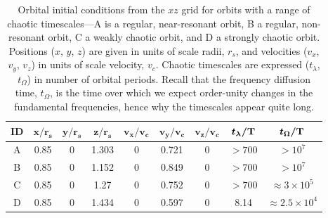 \documentclass[letterpaper,12pt,preprint]{aastex}
\newcommand{\bs}[1]{\boldsymbol{#1}}
\newcommand{\periods}{\ensuremath{{\rm T}}}
\begin{document}
\begin{table}[ht]
\begin{center}
	\begin{tabular}{c | c c c c c c | c c}
		{\bf ID} & $\bs{x/r_s}$ & $\bs{y/r_s}$ & $\bs{z/r_s}$ & $\bs{v_x/v_c}$ & $\bs{v_y/v_c}$ & $\bs{v_z/v_c}$ & $\bs{t_\lambda/\periods}$ & $\bs{t_\Omega/\periods}$ \\\toprule
A & 0.85 & 0 & 1.303 & 0 & 0.721 & 0 & $>700$ & $>10^7$ \\
\midrule
B & 0.85 & 0 & 1.152 & 0 & 0.849 & 0 & $>700$ & $>10^7$\\
\midrule
C & 0.85 & 0 & 1.27 & 0 & 0.752 & 0 & $>700$ & $\approx 3\times10^5$\\
\midrule
D & 0.85 & 0 & 1.434 & 0 & 0.597 & 0 & 8.14 & $\approx 2.5\times10^4$\\
		\bottomrule
		\end{tabular}
	\caption{Orbital initial conditions from the $xz$ grid for orbits with a range of chaotic timescales---A is a regular, near-resonant orbit, B a regular, non-resonant orbit, C a weakly chaotic orbit, and D a strongly chaotic orbit. Positions ($x$, $y$, $z$) are given in units of scale radii, $r_s$, and velocities ($v_x$, $v_y$, $v_z$) in units of scale velocity, $v_c$. Chaotic timescales are expressed ($t_\lambda$, $t_\Omega$) in number of orbital periods. Recall that the frequency diffusion time, $t_\Omega$, is the time over which we expect order-unity changes in the fundamental frequencies, hence why the timescales appear quite long. \label{tbl:orbit-info}}
\end{center}
\end{table}
\end{document}
